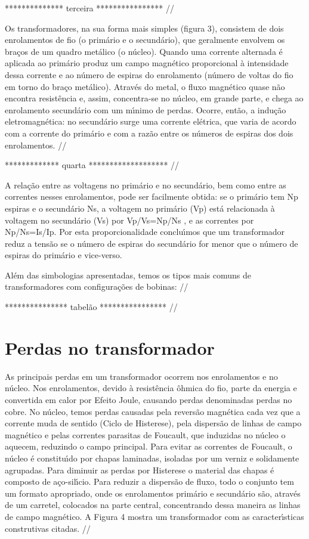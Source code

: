 ************** terceira **************** //

Os transformadores, na sua forma mais simples (figura 3), consistem de dois enrolamentos de fio (o prim\'{a}rio e o secund\'{a}rio), que geralmente envolvem os bra\c{c}os de um quadro met\'{a}lico (o n\'{u}cleo). Quando uma corrente alternada \'{e} aplicada ao prim\'{a}rio produz um campo magn\'{e}tico proporcional \`{a} intensidade dessa corrente e ao n\'{u}mero de espiras do enrolamento (n\'{u}mero de voltas do fio em torno do bra\c{c}o met\'{a}lico). Atrav\'{e}s do metal, o fluxo magn\'{e}tico quase n\~{a}o encontra resist\^{e}ncia e, assim, concentra-se no n\'{u}cleo, em grande parte, e chega ao enrolamento secund\'{a}rio com um m\'{\i}nimo de perdas. Ocorre, ent\~{a}o, a indu\c{c}\~{a}o eletromagn\'{e}tica: no secund\'{a}rio surge uma corrente el\'{e}trica, que varia de acordo com a corrente do prim\'{a}rio e com a raz\~{a}o entre os n\'{u}meros de espiras dos dois enrolamentos. //

************* quarta ******************* //

A rela\c{c}\~{a}o entre as voltagens no prim\'{a}rio e no secund\'{a}rio, bem como entre as correntes nesses enrolamentos, pode ser facilmente obtida: se o prim\'{a}rio tem Np espiras e o secund\'{a}rio Ns, a voltagem no prim\'{a}rio (Vp) est\'{a} relacionada \`{a} voltagem no secund\'{a}rio (Vs) por Vp/Vs=Np/Ns , e as correntes por Np/Ns=Is/Ip. Por esta proporcionalidade conclu\'{\i}mos que um transformador reduz a tens\~{a}o se o n\'{u}mero de espiras do secund\'{a}rio for menor que o n\'{u}mero de espiras do prim\'{a}rio e vice-verso.

Al\'{e}m das simbologias apresentadas, temos os tipos mais comuns de transformadores com configura\c{c}\~{o}es de bobinas: //

*************** tabel\~{a}o **************** //

\section{Perdas no transformador}

As principais perdas em um transformador ocorrem nos enrolamentos e no n\'{u}cleo. Nos enrolamentos, devido \`{a} resist\^{e}ncia \^{o}hmica do fio, parte da energia e convertida em calor por Efeito Joule, causando perdas denominadas perdas no cobre. No n\'{u}cleo, temos perdas causadas pela revers\~{a}o magn\'{e}tica cada vez que a corrente muda de sentido (Ciclo de Histerese), pela dispers\~{a}o de linhas de campo magn\'{e}tico e pelas correntes parasitas de Foucault, que induzidas no n\'{u}cleo o aquecem, reduzindo o campo principal. Para evitar as correntes de Foucault, o n\'{u}cleo \'{e} constitu\'{\i}do por chapas laminadas, isoladas por um verniz e solidamente agrupadas. Para diminuir as perdas por Histerese o material das chapas \'{e} composto de a\c{c}o-sil\'{\i}cio. Para reduzir a dispers\~{a}o de fluxo, todo o conjunto tem um formato apropriado, onde os enrolamentos prim\'{a}rio e secund\'{a}rio s\~{a}o, atrav\'{e}s de um carretel, colocados na parte central, concentrando dessa maneira as linhas de campo magn\'{e}tico. A Figura 4 mostra um transformador com as caracter\'{\i}sticas construtivas citadas. //


